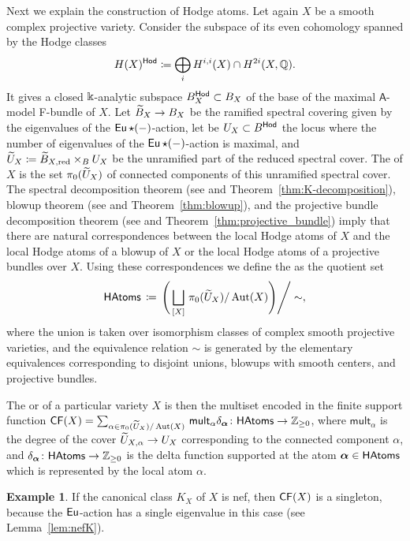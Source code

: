 \documentclass[twoside,leqno]{article}
\numberwithin{equation}{section}
\theoremstyle{plain}
\theoremstyle{definition}
\newtheorem*{example*}{Example}
\begin{document}
Next we explain the construction of Hodge atoms.
Let again $X$ be a smooth complex projective variety. Consider the subspace of its even
cohomology spanned by the Hodge classes
\[
H(X)^{\mathsf{Hod}} \coloneqq \bigoplus_i H^{i,i}(X) \cap H^{2i}(X, \mathbb{Q}) .
\]
It gives a closed $\Bbbk$-analytic subspace $B^{\mathsf{Hod}}_{X} \subset B_{X}$ of the base of the maximal $\mathsf{A}$-model F-bundle of $X$.
Let $\widetilde{B}_{X} \to B_{X}$ be the ramified spectral  covering given by the eigenvalues of the $\operatorname{\mathsf{Eu}}\star (-)$-action, let be $U_X \subset B^{\mathsf{Hod}}$ the locus where the number of eigenvalues of the $\operatorname{\mathsf{Eu}}\star (-)$-action is maximal, and $\widetilde U_X \coloneqq \widetilde{B}_{X,\operatorname{red}} \times_B U_X$ be the unramified part of the reduced spectral cover.
The  of $X$ is the set 
$\pi_{0}(\widetilde U_{X})$ of connected components of this unramified spectral cover.
The spectral decomposition theorem (see \cite{HYZZ_Decomposition} and Theorem~\ref{thm:K-decomposition}), blowup theorem (see \cite{Iritani_blowup} and Theorem~\ref{thm:blowup}), and the projective bundle  decomposition theorem (see \cite{Iritani_Koto,HYZZ_Decomposition} and Theorem~\ref{thm:projective_bundle}) imply that 
there are natural correspondences between the local Hodge atoms of $X$ and the local Hodge atoms of a blowup of $X$ or the local Hodge atoms of a projective bundles over $X$. Using these correspondences we define the  as the quotient set
\[
\mathsf{HAtoms} \, \coloneqq \, \Bigg( \bigsqcup_{[X]} \, \pi_{0}(\widetilde U_{X})/\operatorname{Aut}(X)\Bigg)\Bigg/\sim, 
\] 
where the union is taken over isomorphism classes of complex smooth projective varieties, and the equivalence relation $\sim$ is generated by the elementary equivalences corresponding to 
disjoint unions, blowups with smooth centers, and projective bundles.

The  or  of a particular variety $X$ is then the multiset encoded in the finite support function $\mathsf{CF}(X) = \sum_{\alpha\in\pi_0(\widetilde U_{X})/\operatorname{Aut}(X)} \, \mathsf{mult}_{\alpha} \delta_{\boldsymbol{\alpha}} \colon \mathsf{HAtoms} \to \mathbb Z_{\geq 0}$, where
$\mathsf{mult}_{\alpha}$ is the degree of the cover $\widetilde U_{X,\alpha} \to U_{X}$ corresponding to the connected component $\alpha$, and $\delta_{\boldsymbol{\alpha}}\colon \mathsf{HAtoms} \to \mathbb Z_{\geq 0}$ is the delta function supported at the atom $\boldsymbol{\alpha} \in \mathsf{HAtoms}$ which is represented by the local atom $\alpha$.


\begin{example*}
If the canonical class $K_X$ of $X$ is nef, then $\mathsf{CF}(X)$ is a singleton, because the $\operatorname{\mathsf{Eu}}$-action has a single eigenvalue in this case (see Lemma~\ref{lem:nefK}).
\end{example*}
\end{document}
